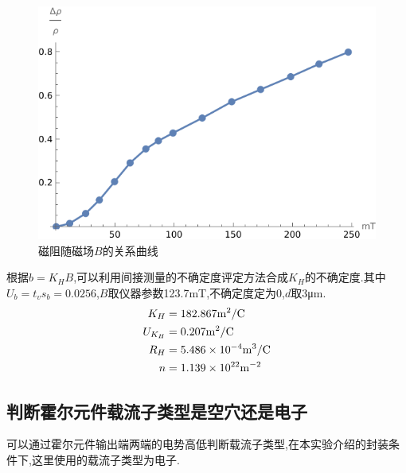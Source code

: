 \documentclass[UTF8,a4paper]{article}%
\begin{document}
\begin{figure}[H]
    \begin{minipage}[t]{0.45\linewidth}
        \centering
        \includegraphics[width=0.8\linewidth]{rho-tesla.png}
        \caption{磁阻随磁场$B$的关系曲线}
        \label{fg:rho-tesla}
    \end{minipage}
\end{figure}
根据$b=K_HB$,可以利用间接测量的不确定度评定方法合成$K_H$的不确定度.其中$U_b=t_vs_b=0.0256$,$B$取仪器参数123.7\unit{\milli\tesla},不确定度定为0,$d$取3\unit{\micro\metre}.
\begin{align*}
    K_H     & =182.867\unit{\metre^2/\C}        \\
    U_{K_H} & =0.207\unit{\metre^2/\C}          \\
    R_H     & =\num{5.486e-4}\unit{\metre^3/\C} \\
    n       & =\num{1.139e22}\unit{\metre^{-2}}
\end{align*}
\subsection{判断霍尔元件载流子类型是空穴还是电子}
可以通过霍尔元件输出端两端的电势高低判断载流子类型,在本实验介绍的封装条件下,这里使用的载流子类型为电子.
\end{document}
